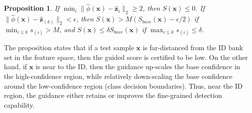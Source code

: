 \documentclass[10pt,twocolumn,letterpaper]{article}
\newtheorem{prop}[thm]{Proposition}
\begin{document}
\begin{prop}
\label{thm:theory}
If $\min_i \lVert \widehat{\phi}(\mathbf{x}) - \widehat{\mathbf{z}}_i\rVert_2 \geq 2$, then $S(\mathbf{x}) \leq 0$. If $\lVert \widehat{\phi}(\mathbf{x}) - \widehat{\mathbf{z}}_{(k)}\rVert_2 < \epsilon$, then $S(\mathbf{x}) > M (S_{base}(\mathbf{x}) - \epsilon/2)$ if $\min_{i \leq k} s_{(i)} > M$, and $S(\mathbf{x}) \leq \delta S_{base}(\mathbf{x})$ if $\max_{i \leq k} s_{(i)} \leq \delta$.
\end{prop}

The proposition states that if a test sample $\mathbf{x}$ is far-distanced from the ID bank set in the feature space, then the guided score is certified to be low. On the other hand, if $\mathbf{x}$ is near to the ID, then the guidance up-scales the base confidence in the high-confidence region, while relatively down-scaling the base confidence around the low-confidence region (\eg class decision boundaries).
Thus, near the ID region, the guidance either retains or improves the fine-grained detection capability.
\end{document}
